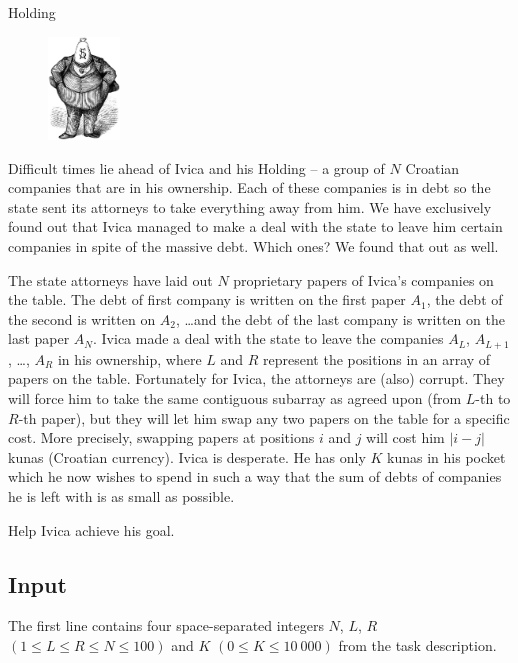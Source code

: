 \begin{statement}[
  problempoints=110,
  timelimit=1 second,
  memorylimit=512 MiB,
]{Holding}

\setlength\intextsep{-0.1cm}
\begin{figure}
\centering
\includegraphics[width=0.17\textwidth]{img/holding.png}
\end{figure}

Difficult times lie ahead of Ivica and his Holding -- a group of $N$ Croatian
companies that are in his ownership. Each of these companies is in debt so the
state sent its attorneys to take everything away from him. We have exclusively
found out that Ivica managed to make a deal with the state to leave him certain
companies in spite of the massive debt. Which ones? We found that out as well.

The state attorneys have laid out $N$ proprietary papers of Ivica's companies
on the table.  The debt of first company is written on the first paper $A_1$,
the debt of the second is written on $A_2$, \dots and the debt of the last
company is written on the last paper $A_N$. Ivica made a deal with the state
to leave the companies $A_L$, $A_{L+1}$, \dots , $A_R$ in his ownership,
where $L$ and $R$ represent the positions in an array of papers on the table.
Fortunately for Ivica, the attorneys are (also) corrupt. They will force him
to take the same contiguous subarray as agreed upon (from $L$-th to $R$-th
paper), but they will let him swap any two papers on the table for a specific
cost. More precisely, swapping papers at positions $i$ and $j$ will cost him
$|i-j|$ kunas (Croatian currency).  Ivica is desperate. He has only $K$ kunas
in his pocket which he now wishes to spend in such a way that the sum of
debts of companies he is left with is as small as possible.

Help Ivica achieve his goal.

\subsection*{Input}
The first line contains four space-separated integers $N$, $L$, $R$
$(1 \le L \le R \le N \le 100)$ and $K$ $(0 \le K \le 10\ 000)$ from the
task description.


\end{statement}
